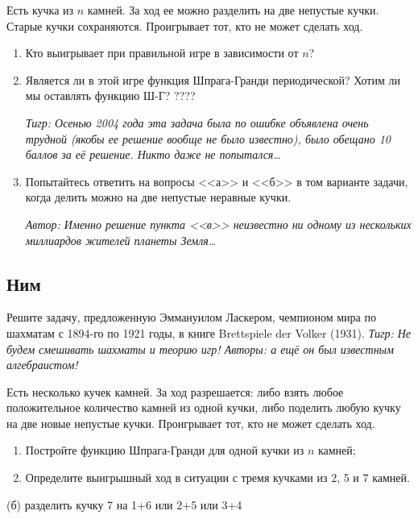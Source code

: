 \begin{problem}
Есть кучка из  $n$  камней. За ход ее можно разделить на две непустые кучки. Старые кучки сохраняются. Проигрывает тот, кто не может сделать ход. \par
\begin{enumerate}
\item 	Кто выигрывает при правильной игре в зависимости от $n$?\par
\item 	Является ли в этой игре функция Шпрага-Гранди периодической? {\red Хотим ли мы оставлять функцию Ш-Г?} ????\par
{\it Тигр: Осенью 2004 года эта задача была по ошибке объявлена очень трудной (якобы ее решение вообще не было известно), было обещано 10 баллов за её решение. Никто даже не попытался\ldots }\par
\item 	Попытайтесь ответить на вопросы <<а>> и <<б>> в том варианте задачи, когда делить можно на две непустые неравные кучки.\par
{\it Автор: Именно решение пункта <<в>> неизвестно ни одному из нескольких миллиардов жителей планеты Земля\ldots }\par
\end{enumerate}


\begin{sol}

\end{sol}
\end{problem}


\subsection{Ним}





\begin{problem}
Решите задачу, предложенную Эммануилом Ласкером, чемпионом мира по шахматам с 1894-го по 1921 годы, в книге Brettspiele der Volker (1931). {\it Тигр: Не будем смешивать шахматы и теорию игр! Авторы: а ещё он был известным алгебраистом!}\par
Есть несколько кучек камней. За ход разрешается: либо взять любое положительное количество камней из одной кучки, либо поделить любую кучку на две новые непустые кучки. Проигрывает тот, кто не может сделать ход.\par
\begin{enumerate}
\item 	Постройте функцию Шпрага-Гранди для одной кучки из  $n$  камней;\par
\item 	Определите выигрышный ход в ситуации с тремя кучками из 2, 5 и 7 камней.\par
\end{enumerate}


\begin{sol}
(б) разделить кучку 7 на 1+6 или 2+5 или 3+4
\end{sol}
\end{problem}

